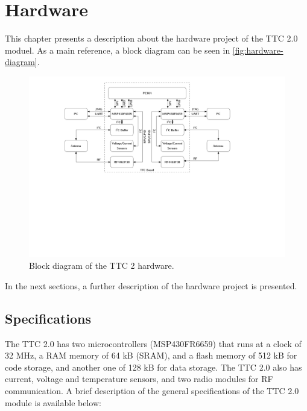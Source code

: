 %
%
%
%
%

%
%
%
%
%


\chapter{Hardware} \label{ch:hardware}

This chapter presents a description about the hardware project of the TTC 2.0 moduel. As a main reference, a block diagram can be seen in \autoref{fig:hardware-diagram}.

\begin{figure}[!h]
	\begin{center}
		\includegraphics[width=\textwidth]{figures/hardware_diagram.pdf}
		\caption{Block diagram of the TTC 2 hardware.}
		\label{fig:hardware-diagram}
	\end{center}
\end{figure}

In the next sections, a further description of the hardware project is presented.

\section{Specifications}

The TTC 2.0 has two microcontrollers (MSP430FR6659) that runs at a clock of 32 MHz, a RAM memory of 64 kB (SRAM), and a flash memory of 512 kB for code storage, and another one of 128 kB for data storage. The TTC 2.0 also has current, voltage and temperature sensors, and two radio modules for RF communication. A brief description of the general specifications of the TTC 2.0 module is available below:

